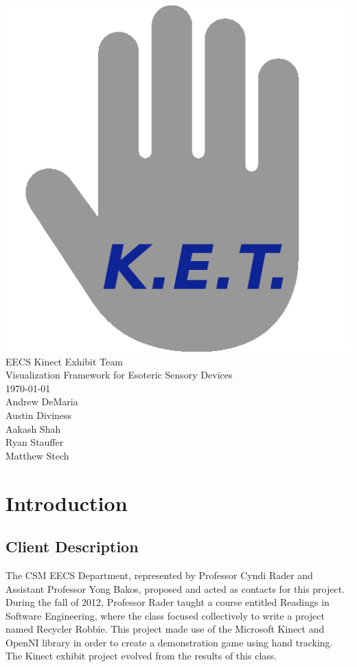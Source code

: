 \documentclass[11pt,letterpaper]{article}
\begin{document}
	\begin{center}
	\vspace*{\fill}
	\includegraphics[height=0.4\textheight]{logo} \\
	\linespread{2}
	\huge EECS Kinect Exhibit Team\\
	\Large Visualization Framework for Esoteric Sensory Devices \\
	\Large \today \\
	\large Andrew DeMaria \\
	\linespread{1}
	\large Austin Diviness \\
	\large Aakash Shah \\
	\large Ryan Stauffer \\
	\large Matthew Stech \\
	\vspace*{\fill}
	\end{center}
	\thispagestyle{empty}
	\pagebreak
 
	\tableofcontents
	\thispagestyle{empty}
	\newpage
 
	\pagestyle{plain}
	\setcounter{page}{1}
	\section{Introduction}
	\subsection{Client Description}
	The CSM EECS Department, represented by Professor Cyndi Rader and 
	Assistant Professor Yong Bakos, proposed and acted as contacts for this 
	project. During the fall of 2012, Professor Rader taught a course entitled 
	Readings in Software Engineering, where the class focused collectively to 
	write a project named Recycler Robbie. This project made use of the 
	Microsoft Kinect and OpenNI library in order to create a demonstration 
	game using hand tracking. The Kinect exhibit project evolved from the 
	results of this class.
 
\end{document}
